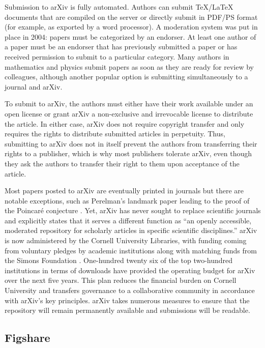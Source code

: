 \documentclass[letterpaper,twocolumn,superscriptaddress,showkeys]{revtex4-1}
\begin{document}
Submission to arXiv is fully automated.  Authors can submit \TeX/\LaTeX
documents that are compiled on the server or directly submit in PDF/PS format
(for example, as exported by a word processor).  A moderation system was put in
place in 2004: papers must be categorized by an endorser. At least one
author of a paper must be an endorser that has previously submitted a paper or
has received permission to submit to a particular category.  Many authors in
mathematics and physics submit papers as soon as they are ready for review by
colleagues, although another popular option is submitting simultaneously to a
journal and arXiv.

To submit to arXiv, the authors must either have their work available under an
open license or grant arXiv a non-exclusive and irrevocable license to
distribute the article. In either case, arXiv does not require copyright
transfer and only requires the rights to distribute submitted articles in
perpetuity. Thus, submitting to arXiv does not in itself prevent the authors
from transferring their rights to a publisher, which is why most publishers
tolerate arXiv, even though they ask the authors to transfer their right to them
upon acceptance of the article. 

Most papers posted to arXiv are eventually printed in journals but there are
notable exceptions, such as Perelman's landmark paper leading to the proof of
the Poincar\'{e} conjecture \cite{2002math.....11159P}. Yet, arXiv has never
sought to replace scientific journals and explicitly states that it serves a
different function as ``an openly accessible, moderated repository for scholarly
articles in specific scientific disciplines.'' arXiv is now administered by the
Cornell University Libraries, with funding coming from voluntary pledges by academic
institutions along with matching funds from the Simons Foundation
\cite{arxiv_future}.  One-hundred twenty six of the top two-hundred institutions
in terms of downloads have provided the operating budget for arXiv over the next
five years.  This plan reduces the financial burden on Cornell University and
transfers governance to a collaborative community in accordance with arXiv's key
principles.  arXiv takes numerous measures to ensure that the repository will
remain permanently available and submissions will be readable.

\subsection{Figshare}
\end{document}
